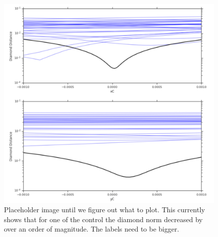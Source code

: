 \documentclass[aps,nofootinbib,pra,notitlepage,twocolumn]{revtex4-1}
\begin{document}
\begin{figure}\label{fig:num}
  \centering
  \includegraphics[width=\columnwidth]{placeholdernumerical.pdf}
  \caption{Placeholder image until we figure out what to plot. This currently shows that for one of the control the diamond norm decreased by over an order of magnitude. The labels need to be bigger.}
  \label{fig:rb}
\end{figure}
\end{document}
